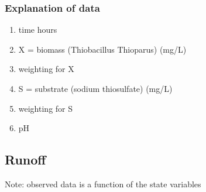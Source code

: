 \documentclass[10pt]{article}
\theoremstyle{plain}
\begin{document}
\subsubsection{Explanation of data}
\begin{enumerate}
\item time hours
\item X = biomass (Thiobacillus Thioparus) (mg/L)
\item weighting for X
\item S = substrate (sodium thiosulfate) (mg/L)
\item weighting for S
\item pH
\end{enumerate}

\subsection{Runoff}
Note: observed data is a function of the state variables



%
%
\end{document}
